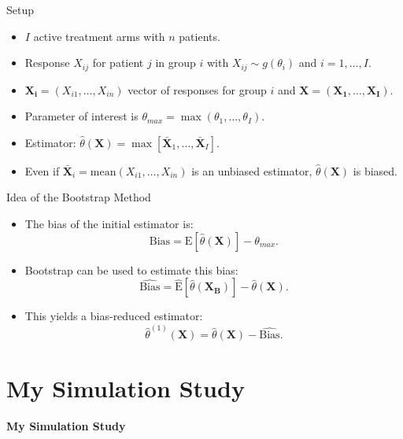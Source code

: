 \documentclass[
  ignorenonframetext,
  aspectratio=169]{beamer}
\providecommand{\tightlist}{%
  \setlength{\itemsep}{0pt}\setlength{\parskip}{0pt}}
\begin{document}
\begin{frame}{Setup}
\label{setup}
\begin{itemize}
\item
  \(I\) active treatment arms with \(n\) patients.
\item
  Response \(X_{ij}\) for patient \(j\) in group \(i\) with
  \(X_{ij} \sim g(\theta_i)\) and \(i = 1, \dots, I\).
\item
  \(\mathbf{X_i} = (X_{i1}, \dots, X_{in})\) vector of responses for
  group \(i\) and \(\mathbf{X} = (\mathbf{X_1}, \dots, \mathbf{X_I}).\)
\item
  Parameter of interest is
  \(\theta_{max} = \max(\theta_1, \dots, \theta_I).\)
\item
  Estimator:
  \(\hat{\theta}(\mathbf{X}) = \max[\bar{\mathbf{X}}_1, \dots ,\bar{\mathbf{X}}_I]\).
\item
  Even if \(\bar{\mathbf{X}}_i = \mathrm{mean}(X_{i1}, \dots, X_{in})\)
  is an unbiased estimator, \(\hat{\theta}(\mathbf{X})\) is biased.
\end{itemize}
\end{frame}

\begin{frame}{Idea of the Bootstrap Method}
\label{idea-of-the-bootstrap-method}
\begin{itemize}
\tightlist
\item
  The bias of the initial estimator is:
  \[\mathrm{Bias} = \mathrm{E}[\hat{\theta}(\mathbf{X})] - \theta_{max}.\]
\item
  Bootstrap can be used to estimate this bias:
  \[\widehat{\mathrm{Bias}} = \hat{\mathrm{E}}[\hat{\theta}(\mathbf{X_B})] - \hat{\theta}(\mathbf{X}).\]
\item
  This yields a bias-reduced estimator:
  \[\hat{\theta}^{(1)}(\mathbf{X}) = \hat{\theta}(\mathbf{X}) - \widehat{\mathrm{Bias}}.\]
\end{itemize}
\end{frame}

\section{My Simulation Study}\label{my-simulation-study}

\begin{frame}
\textcolor{uniblue}{\Huge \textbf{My Simulation Study}}
\end{frame}
\end{document}
